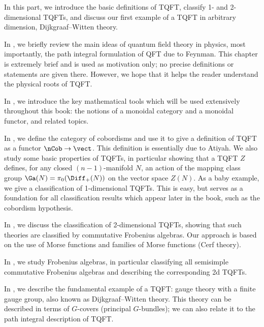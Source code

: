 In this part, we introduce the basic definitions of TQFT, classify 1- and
2-dimensional TQFTs, and discuss our first example of a TQFT in arbitrary
dimension, Dijkgraaf--Witten theory.

In , we briefly review the main ideas of quantum
field theory in physics, most importantly, the path integral formulation of QFT
due to Feynman. This chapter is extremely brief and is used as motivation only;
no precise definitions or statements are given there. However, we hope that it
helps the reader understand the physical roots of TQFT.

In , we introduce the key mathematical tools which will be
used extensively throughout this book: the notions of a monoidal category and a
monoidal functor, and related topics.

In , we define the category of cobordisms and use
it to give a definition of TQFT as a functor $\nCob\to \vect$. This definition
is essentially due to Atiyah. We also study some basic properties of TQFTs, in
particular showing that a TQFT $Z$ defines, for any closed $(n-1)$-manifold
$N$, an action of the mapping class group $\Ga(N)=\pi_0(\Diff_+(N))$ on the
vector space $Z(N)$. As a baby example, we give a classification of
1-dimensional TQFTs. This is easy, but serves as a foundation for all
classification results which appear later in the book, such as the cobordism
hypothesis.

In , we discuss the classification of 2-dimensional
TQFTs, showing that such theories are classified by commutative Frobenius
algebras. Our approach is based on the use of Morse functions and families of
Morse functions (Cerf theory).

In , we study Frobenius algebras, in particular classifying
all semisimple commutative Frobenius algebras and describing the corresponding
2d TQFTs.

In , we describe the fundamental example of a TQFT: gauge theory
with a finite gauge group, also known as Dijkgraaf--Witten theory. This theory
can be described in terms of $G$-covers (principal $G$-bundles); we can also
relate it to the path integral description of TQFT.
